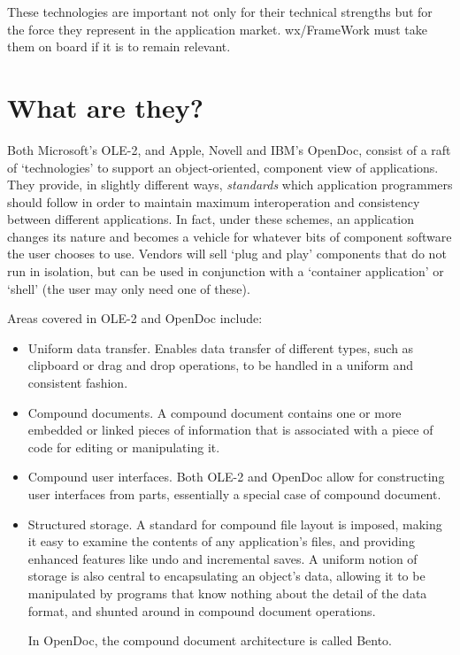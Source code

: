 These technologies are important not only for their technical strengths
but for the force they represent in the application market.
wx/FrameWork must take them on board if it is to remain relevant.

\section{What are they?}

Both Microsoft's OLE-2, and Apple, Novell and IBM's OpenDoc, consist of
a raft of `technologies' to support an object-oriented, component view
of applications. They provide, in slightly different ways, {\it
standards} which application programmers should follow in order to
maintain maximum interoperation and consistency between different
applications. In fact, under these schemes, an application changes its
nature and becomes a vehicle for whatever bits of component software the
user chooses to use. Vendors will sell `plug and play' components that
do not run in isolation, but can be used in conjunction with a
`container application' or `shell' (the user may only need one of these).

Areas covered in OLE-2 and OpenDoc include:

\begin{itemize}
\item Uniform data transfer. Enables data transfer of different types,
such as clipboard or drag and drop operations, to be handled in a
uniform and consistent fashion.
\item Compound documents. A compound document contains one or more
embedded or linked pieces of information that is associated with a piece of code
for editing or manipulating it.
\item Compound user interfaces. Both OLE-2 and OpenDoc allow for
constructing user interfaces from parts, essentially a special case of
compound document.
\item Structured storage. A standard for compound file layout is
imposed, making it easy to examine the contents of any application's files, and
providing enhanced features like undo and incremental saves. A uniform
notion of storage is also central to encapsulating an object's data,
allowing it to be manipulated by programs that know nothing about the
detail of the data format, and shunted around in compound document
operations.

In OpenDoc, the compound document architecture is called Bento.
\end{itemize}

